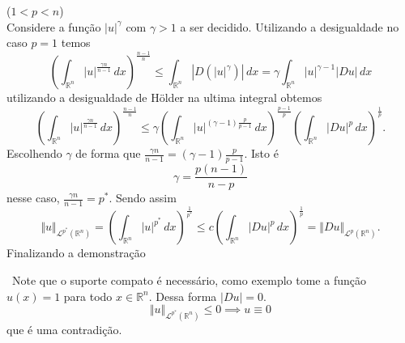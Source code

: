 \documentclass[a4paper, 11pt]{book}
\theoremstyle{definition}
\newcommand{\obs}{\noindent{\textbf{\textcolor{black}{\sffamily Observação:}}}~}
\newcommand{\bR}{\mathbb{R}}
\newcommand{\cL}{\mathcal{L}}
\begin{document}
\begin{prf}
    ($1 < p < n$)\\
    Considere a função $|u|^\gamma$ com $\gamma > 1$ a ser decidido. Utilizando a desigualdade no caso $p = 1$ temos
    \[
        \left( \int_{\bR^n} |u|^{\frac{\gamma n}{n - 1}}  \, dx\right)^{\frac{n-1}{n}} \leqslant \int_{\bR^n} |D(|u|^{\gamma})| \,dx = \gamma \int_{\bR^n} |u|^{\gamma-1} |Du| \,dx
    \]
    utilizando a desigualdade de Hölder na ultima integral obtemos
    \[
        \left( \int_{\bR^n} |u|^{\frac{\gamma n}{n - 1}}  \, dx\right)^{\frac{n-1}{n}} \leqslant \gamma\left( \int_{\bR^n} |u|^{(\gamma-1)\frac{p}{p-1}} \,dx \right)^{\frac{p-1}{p}} \left( \int_{\bR^n} |Du|^p \,dx \right)^{\frac{1}{p}}.
    \]
    Escolhendo $\gamma$ de forma que $\frac{\gamma n}{n - 1} = (\gamma -1)\frac{p}{p-1}$. Isto é
    \[
        \gamma = \frac{p(n-1)}{n-p}
    \]
    nesse caso, $\frac{\gamma n}{n-1} = p^*$. Sendo assim
    \[
        \Vert u \Vert_{\cL^{p^*}(\bR^n)} = \left( \int_{\bR^n} |u|^{p^*} \,dx \right)^{\frac{1}{p^*}} \leqslant c \left( \int_{\bR^n} |Du|^p \,dx\right)^{\frac{1}{p}} = \Vert Du \Vert_{\cL^p(\bR^n)}.
    \]
    Finalizando a demonstração
\end{prf}

\obs Note que o suporte compato é necessário, como exemplo tome a função $u(x) = 1$ para todo $x \in \bR^n$. Dessa forma $|Du| = 0$.
\[
    \Vert u \Vert_{\cL^{p^*}(\bR^n)} \leqslant 0 \implies u \equiv 0
\]
que é uma contradição.
\end{document}
